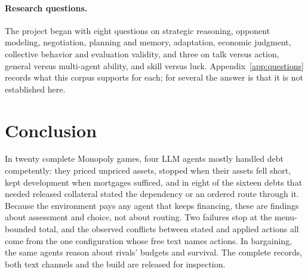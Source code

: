 \documentclass[10pt,twocolumn,letterpaper]{article}
\begin{document}
\paragraph{Research questions.} The project began with eight questions on strategic reasoning, opponent modeling, negotiation, planning and memory, adaptation, economic judgment, collective behavior and evaluation validity, and three on talk versus action, general versus multi-agent ability, and skill versus luck. Appendix~\ref{app:questions} records what this corpus supports for each; for several the answer is that it is not established here.

\section{Conclusion}
In twenty complete Monopoly games, four LLM agents mostly handled debt competently: they priced unpriced assets, stopped when their assets fell short, kept development when mortgages sufficed, and in eight of the sixteen debts that needed released collateral stated the dependency or an ordered route through it. Because the environment pays any agent that keeps financing, these are findings about assessment and choice, not about routing. Two failures stop at the menu-bounded total, and the observed conflicts between stated and applied actions all come from the one configuration whose free text names actions. In bargaining, the same agents reason about rivals' budgets and survival. The complete records, both text channels and the build are released for inspection.

\begingroup\small\setlength{\bibsep}{1.5pt}


\endgroup

\clearpage
\onecolumn
\appendix

\end{document}
